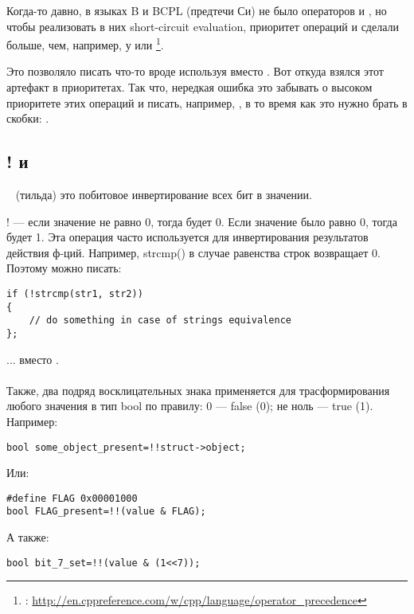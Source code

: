 Когда-то давно\cite{dmr:1995}, в языках B и BCPL (предтечи Си) не было операторов \IT{\&\&} и \IT{||}, 
но чтобы реализовать в них
short-circuit evaluation, приоритет операций \IT{\&} и \IT{|} сделали больше, чем, например, у \IT{\^} или \IT{+}
\footnote{: \url{http://en.cppreference.com/w/cpp/language/operator_precedence}}.

Это позволяло писать что-то вроде  используя \IT{\&} вместо \IT{\&\&}. Вот откуда взялся
этот артефакт в приоритетах.
Так что, нередкая ошибка это забывать о высоком приоритете этих операций и писать, например,
, в то время как это нужно брать в скобки: .

\subsection{! и ~}

~ (тильда) это побитовое инвертирование всех бит в значении.

! --- если значение не равно 0, тогда будет 0. Если значение было равно 0, тогда будет 1. Эта операция часто
используется для инвертирования результатов действия ф-ций. Например, strcmp() в случае равенства строк возвращает 0.
Поэтому можно писать:

\begin{lstlisting}
if (!strcmp(str1, str2))
{
	// do something in case of strings equivalence
};
\end{lstlisting}

... вместо . \\
\\
Также, два подряд восклицательных знака применяется для трасформирования любого значения в тип bool
по правилу: 0 --- false (0); не ноль --- true (1).
Например:

\begin{lstlisting}
bool some_object_present=!!struct->object;
\end{lstlisting}

Или:

\begin{lstlisting}
#define FLAG 0x00001000
bool FLAG_present=!!(value & FLAG);
\end{lstlisting}

А также:

\begin{lstlisting}
bool bit_7_set=!!(value & (1<<7));
\end{lstlisting}

